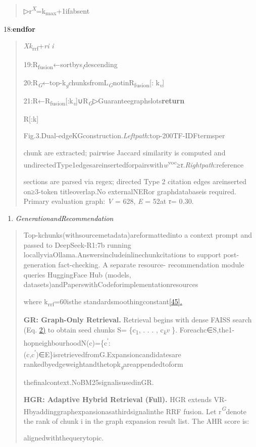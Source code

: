 \documentclass[
]{article}
\begin{document}
\begin{quote}
▷r\emph{\textsuperscript{X}}=k\textsubscript{max}+1ifabsent
\end{quote}

18:\textbf{endfor}

\begin{quote}
\emph{Xk}\textsubscript{rrf}+\emph{ri} \emph{i}

19:R\textsubscript{fusion}←sortbys\emph{\textsubscript{i}}descending

20:R\emph{\textsubscript{G}}←top-k\emph{\textsubscript{g}}chunksfromL\emph{\textsubscript{G}}notinR\textsubscript{fusion}{[}: k\emph{\textsubscript{v}}{]}

21:R←R\textsubscript{fusion}{[}:k\emph{\textsubscript{v}}{]}∪R\emph{\textsubscript{G}}▷Guaranteegraphslots\textbf{return}

R{[}:k{]}

Fig.3.Dual-edgeKGconstruction.\emph{Leftpath}:top-200TF-IDFtermsper

chunk are extracted; pairwise Jaccard similarity is computed and undirectedType1edgesareinsertedforpairswith\emph{w}\textsuperscript{voc}≥\emph{τ}.\emph{Rightpath}:reference

sections are parsed via regex; directed Type 2 citation edges areinserted on≥3-token titleoverlap.No externalNERor graphdatabaseis required. Primary evaluation graph: \textbar{}\emph{V} \textbar{} = 628, \textbar{}\emph{E}\textbar{} = 52at \emph{τ}= 0\emph{.}30.
\end{quote}

\begin{enumerate}
\def\labelenumi{\Alph{enumi}.}
\setcounter{enumi}{4}
\item
  \emph{GenerationandRecommendation}
\end{enumerate}

\begin{quote}
Top-kchunks(withsourcemetadata)areformattedinto a context prompt and passed to DeepSeek-R1:7b running locallyviaOllama.Answersincludeinlinechunkcitations to support post-generation fact-checking. A separate resource- recommendation module queries HuggingFace Hub (models, datasets)andPaperswithCodeforimplementationresources

where k\textsubscript{rrf}=60isthe standardsmoothingconstant\hyperref[_bookmark53]{{[}45{]}.}

\textbf{GR: Graph-Only Retrieval.} Retrieval begins with dense FAISS search (Eq. \hyperref[_bookmark5]{2)} to obtain seed chunks S= \{c\textsubscript{1}, . . . , c\emph{\textsubscript{k}v} \}. Foreachc∈S,the1-hopneighbourhoodN(c)=\{c\textsuperscript{′}: (c,c\textsuperscript{′})∈E\}isretrievedfromG.Expansioncandidatesare rankedbyedgeweightandthetopk\emph{\textsubscript{g}}areappendedtoform

thefinalcontext.NoBM25signalisusedinGR.

\textbf{HGR: Adaptive Hybrid Retrieval (Full).} HGR extends VR-Hbyaddinggraphexpansionasathirdsignalinthe RRF fusion. Let r\emph{\textsuperscript{G}}denote the rank of chunk i in the graph expansion result list. The AHR score is:

alignedwiththequerytopic.
\end{quote}
\end{document}

